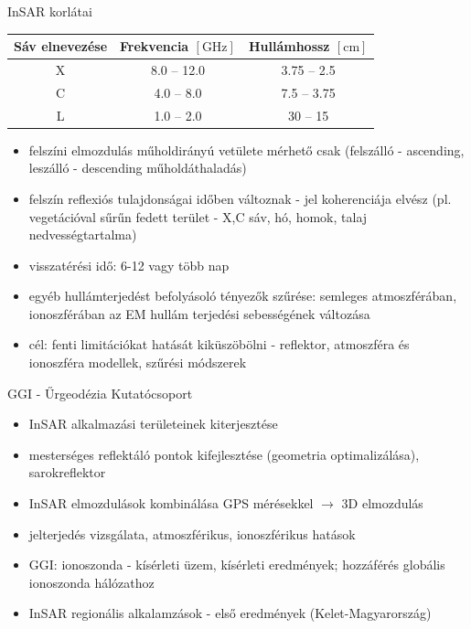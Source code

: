 \documentclass{beamer}
\begin{document}
\begin{frame}{InSAR korlátai}

\begin{table}
\begin{tabular}{| c | c | c |} \hline
Sáv elnevezése & Frekvencia $[\text{GHz}]$ & Hullámhossz $[\text{cm}]$ \\ \hline \hline
X & 8.0 -- 12.0 & 3.75 -- 2.5 \\ \hline
C & 4.0 -- 8.0 & 7.5 -- 3.75 \\ \hline
L & 1.0 -- 2.0 & 30 -- 15 \\ \hline
\end{tabular}
\end{table}

\begin{itemize}
    \item felszíni elmozdulás műholdirányú vetülete mérhető csak
    (felszálló - ascending, leszálló - descending műholdáthaladás)
    \item felszín reflexiós tulajdonságai időben változnak - jel koherenciája
    elvész (pl. vegetációval sűrűn fedett terület - X,C sáv, hó, homok, talaj
    nedvességtartalma)
    \item visszatérési idő: 6-12 vagy több nap
    \item egyéb hullámterjedést befolyásoló tényezők szűrése: semleges
    atmoszférában, ionoszférában az EM hullám terjedési sebességének változása
    \item cél: fenti limitációkat hatását kiküszöbölni - reflektor, atmoszféra
    és ionoszféra modellek, szűrési módszerek
\end{itemize}

\end{frame}


\begin{frame}{GGI - Űrgeodézia Kutatócsoport}

\begin{itemize}
    \item InSAR alkalmazási területeinek kiterjesztése
    \item mesterséges reflektáló pontok kifejlesztése
    (geometria optimalizálása), sarokreflektor
    \item InSAR elmozdulások kombinálása GPS mérésekkel $\rightarrow$ 3D elmozdulás
    \item jelterjedés vizsgálata, atmoszférikus, ionoszférikus hatások
    \item GGI: ionoszonda - kísérleti üzem, kísérleti eredmények; hozzáférés
    globális ionoszonda hálózathoz
    \item InSAR regionális alkalamzások - első eredmények (Kelet-Magyarország)
\end{itemize}

\end{frame}
\end{document}
